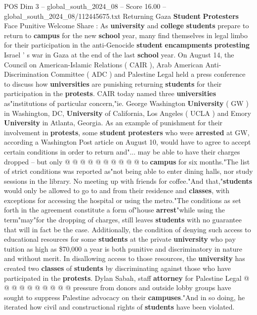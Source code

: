 \begin{textsample}{POS Dim 3 – global\_south\_2024\_08 – Score 16.00 – global\_south\_2024\_08/112445675.txt}  \label{ex:f3_pos_333}
Returning Gaza \textbf{Student} \textbf{Protesters} Face Punitive Welcome Share : As \textbf{university} and \textbf{college} \textbf{students} prepare to return to \textbf{campus} for the new \textbf{school} year, many find themselves in legal limbo for their participation in the anti-Genocide \textbf{student} \textbf{encampments} \textbf{protesting} Israel ' s war in Gaza at the end of the last \textbf{school} year.
On August 14, the Council on American-Islamic Relations ( CAIR ), Arab American Anti-Discrimination Committee ( ADC ) and Palestine Legal held a press conference to discuss how \textbf{universities} are punishing returning \textbf{students} for their participation in the \textbf{protests}.
CAIR today named three \textbf{universities} as"institutions of particular concern,"ie.
George Washington \textbf{University} ( GW ) in Washington, DC, \textbf{University} of California, Los Angeles ( UCLA ) and Emory \textbf{University} in Atlanta, Georgia.
As an example of punishment for their involvement in \textbf{protests}, some \textbf{student} \textbf{protesters} who were \textbf{arrested} at GW, according a Washington Post article on August 10, would have to agree to accept certain conditions in order to return and"... may be able to have their charges dropped -- but only @ @ @ @ @ @ @ @ @ @ to \textbf{campus} for six months."The list of strict conditions was reported as"not being able to enter dining halls, nor study sessions in the library.
No meeting up with friends for coffee."And that,"\textbf{students} would only be allowed to go to and from their residence and \textbf{classes}, with exceptions for accessing the hospital or using the metro."The conditions as set forth in the agreement constitute a form of"house \textbf{arrest}"while using the term"may"for the dropping of charges, still leaves \textbf{students} with no guarantee that will in fact be the case.
Additionally, the condition of denying such access to educational resources for some \textbf{students} at the private \textbf{university} who pay tuition as high as \$70,000 a year is both punitive and discriminatory in nature and without merit.
In disallowing access to those resources, the \textbf{university} has created two \textbf{classes} of \textbf{students} by discriminating against those who have participated in the \textbf{protests}.
Dylan Sabah, staff \textbf{attorney} for Palestine Legal @ @ @ @ @ @ @ @ @ @ pressure from donors and outside lobby groups have sought to suppress Palestine advocacy on their \textbf{campuses}."And in so doing, he iterated how civil and constructional rights of \textbf{students} have been violated.

\end{textsample}
